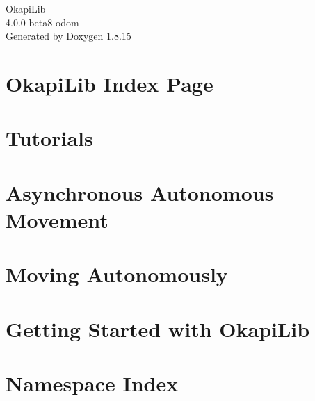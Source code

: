 \let\mypdfximage\pdfximage\def\pdfximage{\immediate\mypdfximage}\documentclass[twoside]{book}
\newcommand{\+}{\discretionary{\mbox{\scriptsize$\hookleftarrow$}}{}{}}
\newcommand{\clearemptydoublepage}{%
  \newpage{\pagestyle{empty}\cleardoublepage}%
}
\begin{document}
\hypersetup{pageanchor=false,
             bookmarksnumbered=true,
             pdfencoding=unicode
            }
\begin{titlepage}
\vspace*{7cm}
\begin{center}%
{\Large Okapi\+Lib \\[1ex]\large 4.\+0.\+0-\/beta8-\/odom }\\
\vspace*{1cm}
{\large Generated by Doxygen 1.8.15}\\
\end{center}
\end{titlepage}
\clearemptydoublepage
{}
\tableofcontents
\clearemptydoublepage
{}
\hypersetup{pageanchor=true}

\chapter{Okapi\+Lib Index Page}
\label{index}\hypertarget{index}{}
\chapter{Tutorials}
\label{md_docs_tutorials_index}

\chapter{Asynchronous Autonomous Movement}
\label{md_docs_tutorials_walkthrough_asyncAutonomousMovement}

\chapter{Moving Autonomously}
\label{md_docs_tutorials_walkthrough_basicAutonomousMovement}

\chapter{Getting Started with Okapi\+Lib}
\label{md_docs_tutorials_walkthrough_gettingStarted}

\chapter{Namespace Index}

\end{document}
